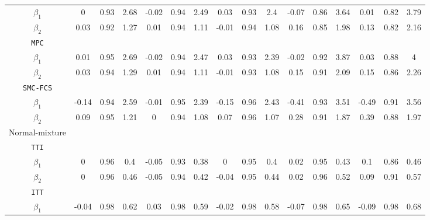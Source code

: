 \begin{table}[ht!]
{\begin{tabular}{c|ccc|ccc|ccc|ccc|ccc}
				$\beta_1$      & 0  & 0.93  & 2.68  & -0.02  & 0.94   & 2.49  & 0.03  & 0.93  & 2.4  & -0.07  & 0.86  & 3.64  & 0.01  & 0.82  & 3.79   \\
				$\beta_2$      & 0.03  & 0.92  & 1.27  & 0.01  & 0.94  & 1.11  & -0.01  & 0.94  & 1.08  & 0.16  & 0.85  & 1.98  & 0.13  & 0.82  & 2.16   \\
				\texttt{MPC}            &        &        &        &        &        &        &        &        &        &        &        &        &        &        &        \\
				$\beta_1$      & 0.01  & 0.95  & 2.69  & -0.02  & 0.94  & 2.47  & 0.03  & 0.93  & 2.39  & -0.02  & 0.92  & 3.87  & 0.03  & 0.88  & 4  \\
				$\beta_2$      & 0.03  & 0.94  & 1.29  & 0.01  & 0.94  & 1.11  & -0.01   & 0.93  & 1.08  & 0.15  & 0.91  & 2.09  & 0.15  & 0.86  & 2.26  \\
				\texttt{SMC-FCS}        &        &        &        &        &        &        &        &        &        &        &        &        &        &        &        \\
				$\beta_1$      & -0.14  & 0.94  & 2.59  & -0.01  & 0.95  & 2.39  & -0.15  & 0.96  & 2.43  & -0.41   & 0.93  & 3.51  & -0.49  & 0.91  & 3.56  \\
				$\beta_2$      & 0.09  & 0.95  & 1.21  & 0  & 0.94  & 1.08  & 0.07  & 0.96  & 1.07  & 0.28  & 0.91  & 1.87  & 0.39  & 0.88  & 1.97  \\
				\hline
				Normal-mixture &        &        &        &        &        &        &        &        &        &        &        &        &        &        &        \\
				\texttt{TTI}            &        &        &        &        &        &        &        &        &        &        &        &        &        &        &        \\
				$\beta_1$      & 0  & 0.96  & 0.4  & -0.05  & 0.93  & 0.38  & 0  & 0.95   & 0.4  & 0.02  & 0.95  & 0.43  & 0.1  & 0.86  & 0.46  \\
				$\beta_2$      & 0  & 0.96  & 0.46  & -0.05  & 0.94  & 0.42  & -0.04  & 0.95  & 0.44  & 0.02  & 0.96  & 0.52  & 0.09  & 0.91  & 0.57  \\
				\texttt{ITT}            &        &        &        &        &        &        &        &        &        &        &        &        &        &        &        \\
				$\beta_1$      & -0.04  & 0.98  & 0.62  & 0.03  & 0.98  & 0.59  & -0.02  & 0.98   & 0.58  & -0.07  & 0.98  & 0.65  & -0.09  & 0.98  & 0.68  \\

\end{tabular}}
\end{table}
